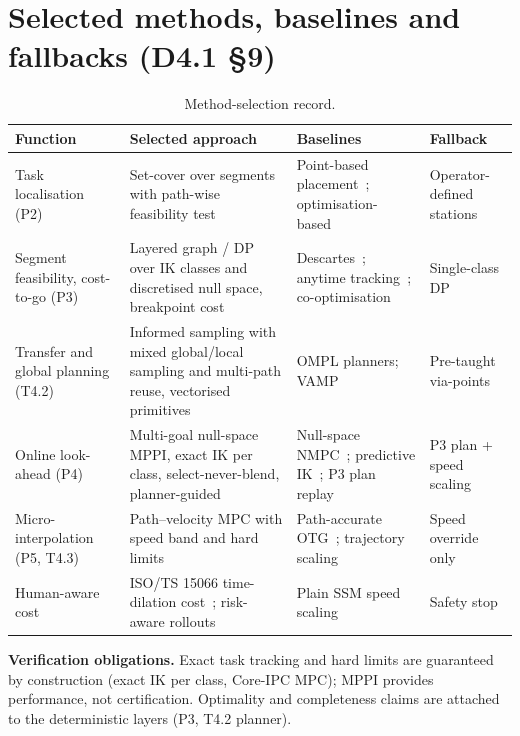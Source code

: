 \documentclass[10pt,a4paper]{article}
\begin{document}
\section{Selected methods, baselines and fallbacks (D4.1 \S9)}
\begin{table}[h]
\centering\small
\caption{Method-selection record.}\label{tab:methods}
\begin{tabularx}{\textwidth}{@{}L{2.7cm}YL{3.6cm}L{2.7cm}@{}}
\toprule
\textbf{Function} & \textbf{Selected approach} & \textbf{Baselines} & \textbf{Fallback} \\
\midrule
Task localisation (P2) & Set-cover over segments with path-wise feasibility test & Point-based placement~\cite{makhal2018reuleaux,nguyen2023taskclustering}; optimisation-based~\cite{zhao2025bstar,weingartshofer2021tcpbase} & Operator-defined stations \\
Segment feasibility, cost-to-go (P3) & Layered graph / DP over IK classes and discretised null space, breakpoint cost & Descartes~\cite{demaeyer2017descartes}; anytime tracking~\cite{wang2025anytimetracking}; co-optimisation~\cite{chen2025cooptimization} & Single-class DP \\
Transfer and global planning (T4.2) & Informed sampling with mixed global/local sampling and multi-path reuse, vectorised primitives & OMPL planners; VAMP~\cite{thomason2024vamp} & Pre-taught via-points \\
Online look-ahead (P4) & Multi-goal null-space MPPI, exact IK per class, select-never-blend, planner-guided & Null-space NMPC~\cite{sun2024nullspacempc}; predictive IK~\cite{faroni2019pik}; P3 plan replay & P3 plan + speed scaling \\
Micro-interpolation (P5, T4.3) & Path--velocity MPC with speed band and hard limits & Path-accurate OTG~\cite{lange2016pathaccurate}; trajectory scaling~\cite{faroni2020scaling,palleschi2021fastsafe} & Speed override only \\
Human-aware cost & ISO/TS 15066 time-dilation cost~\cite{faroni2022safetyaware}; risk-aware rollouts~\cite{trevisan2025drampi} & Plain SSM speed scaling & Safety stop \\
\bottomrule
\end{tabularx}
\end{table}

\noindent\textbf{Verification obligations.} Exact task tracking and hard limits are guaranteed by construction (exact IK per class, Core-IPC MPC); MPPI provides performance, not certification. Optimality and completeness claims are attached to the deterministic layers (P3, T4.2 planner).
\end{document}
